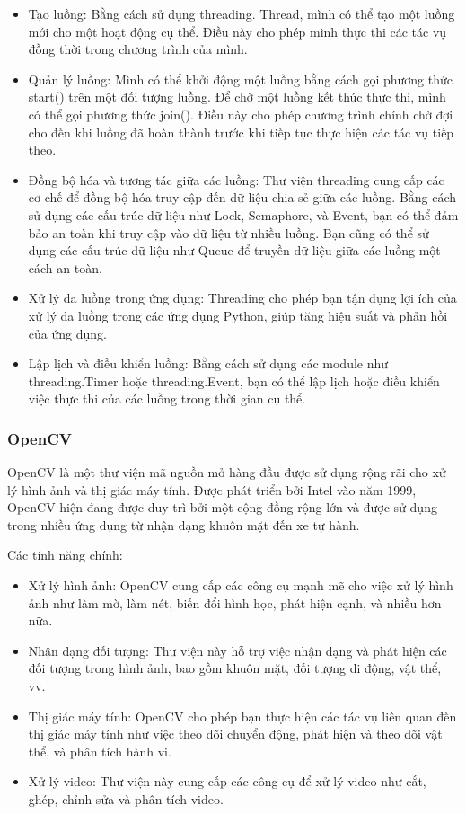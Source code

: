 \documentclass[a4paper]{article}
\begin{document}
     \begin{itemize}
         \item Tạo luồng: Bằng cách sử dụng threading. Thread, mình có thể tạo một luồng mới cho một hoạt động cụ thể. Điều này cho phép mình thực thi các tác vụ đồng thời trong chương trình của mình.
         \item Quản lý luồng: Mình có thể khởi động một luồng bằng cách gọi phương thức start() trên một đối tượng luồng. Để chờ một luồng kết thúc thực thi, mình có thể gọi phương thức join(). Điều này cho phép chương trình chính chờ đợi cho đến khi luồng đã hoàn thành trước khi tiếp tục thực hiện các tác vụ tiếp theo.
         \item Đồng bộ hóa và tương tác giữa các luồng: Thư viện threading cung cấp các cơ chế để đồng bộ hóa truy cập đến dữ liệu chia sẻ giữa các luồng. Bằng cách sử dụng các cấu trúc dữ liệu như Lock, Semaphore, và Event, bạn có thể đảm bảo an toàn khi truy cập vào dữ liệu từ nhiều luồng. Bạn cũng có thể sử dụng các cấu trúc dữ liệu như Queue để truyền dữ liệu giữa các luồng một cách an toàn.
         \item Xử lý đa luồng trong ứng dụng: Threading cho phép bạn tận dụng lợi ích của xử lý đa luồng trong các ứng dụng Python, giúp tăng hiệu suất và phản hồi của ứng dụng.
         \item Lập lịch và điều khiển luồng: Bằng cách sử dụng các module như threading.Timer hoặc threading.Event, bạn có thể lập lịch hoặc điều khiển việc thực thi của các luồng trong thời gian cụ thể.
     \end{itemize}
\subsubsection{OpenCV}
    \hspace*{0.5cm} OpenCV là một thư viện mã nguồn mở hàng đầu được sử dụng rộng rãi cho xử lý hình ảnh và thị giác máy tính. Được phát triển bởi Intel vào năm 1999, OpenCV hiện đang được duy trì bởi một cộng đồng rộng lớn và được sử dụng trong nhiều ứng dụng từ nhận dạng khuôn mặt đến xe tự hành.

    \hspace*{0.5cm} Các tính năng chính:
    \begin{itemize}
        \item Xử lý hình ảnh: OpenCV cung cấp các công cụ mạnh mẽ cho việc xử lý hình ảnh như làm mờ, làm nét, biến đổi hình học, phát hiện cạnh, và nhiều hơn nữa.
        \item Nhận dạng đối tượng: Thư viện này hỗ trợ việc nhận dạng và phát hiện các đối tượng trong hình ảnh, bao gồm khuôn mặt, đối tượng di động, vật thể, vv.
        \item Thị giác máy tính: OpenCV cho phép bạn thực hiện các tác vụ liên quan đến thị giác máy tính như việc theo dõi chuyển động, phát hiện và theo dõi vật thể, và phân tích hành vi.
        \item Xử lý video: Thư viện này cung cấp các công cụ để xử lý video như cắt, ghép, chỉnh sửa và phân tích video.
    \end{itemize}
\end{document}
